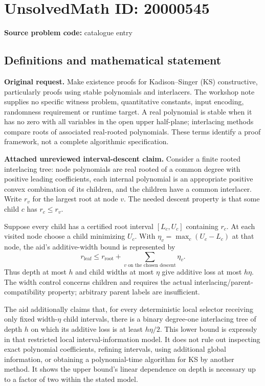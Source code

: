 \documentclass[11pt]{article}
\begin{document}
\section*{UnsolvedMath ID: 20000545}
\textbf{Source problem code:} catalogue entry
\subsection{Definitions and mathematical statement}
\textbf{Original request.} Make existence proofs for Kadison--Singer (KS) constructive, particularly proofs using stable polynomials and interlacers. The workshop note supplies no specific witness problem, quantitative constants, input encoding, randomness requirement or runtime target. A real polynomial is stable when it has no zero with all variables in the open upper half-plane; interlacing methods compare roots of associated real-rooted polynomials. These terms identify a proof framework, not a complete algorithmic specification.

\textbf{Attached unreviewed interval-descent claim.} Consider a finite rooted interlacing tree: node polynomials are real rooted of a common degree with positive leading coefficients, each internal polynomial is an appropriate positive convex combination of its children, and the children have a common interlacer. Write $r_v$ for the largest root at node $v$. The needed descent property is that some child $c$ has $r_c\le r_v$.

Suppose every child has a certified root interval $[L_c,U_c]$ containing $r_c$. At each visited node choose a child minimizing $U_c$. With $\eta_v=\max_c(U_c-L_c)$ at that node, the aid's additive-width bound is represented by
\[r_{\mathrm{leaf}}\le r_{\mathrm{root}}+\sum_{v\text{ on the chosen descent}}\eta_v.\]
Thus depth at most $h$ and child widths at most $\eta$ give additive loss at most $h\eta$. The width control concerns children and requires the actual interlacing/parent-compatibility property; arbitrary parent labels are insufficient.

The aid additionally claims that, for every deterministic local selector receiving only fixed width-$\eta$ child intervals, there is a binary degree-one interlacing tree of depth $h$ on which its additive loss is at least $h\eta/2$. This lower bound is expressly in that restricted local interval-information model. It does not rule out inspecting exact polynomial coefficients, refining intervals, using additional global information, or obtaining a polynomial-time algorithm for KS by another method. It shows the upper bound's linear dependence on depth is necessary up to a factor of two within the stated model.
\end{document}
